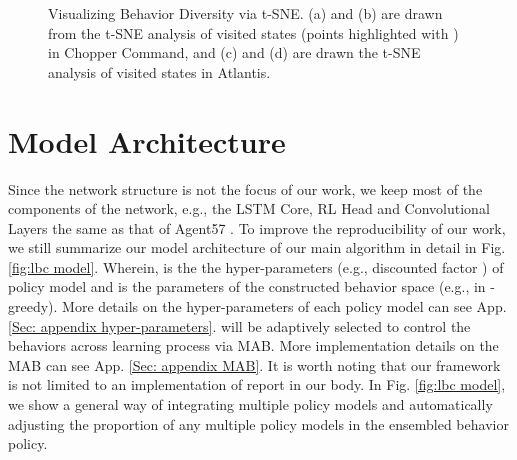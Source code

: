 \begin{figure*}[!t]
\vspace{-0.1in}
\caption{Visualizing Behavior Diversity via t-SNE. (a) and (b) are drawn from the t-SNE analysis of visited states (points highlighted  with ) in  Chopper Command, and (c) and (d) are drawn the t-SNE analysis of visited states in Atlantis.}
\label{fig:tsne study}
\end{figure*}






\clearpage





\section{Model Architecture}
\label{app: Model Architecture}



Since the network structure is not the focus of our work, we keep most of the components of the network, e.g., the LSTM Core, RL Head and Convolutional Layers the same as that of Agent57 \citep{agent57}. To improve the reproducibility of our work, we still summarize our  model architecture of our main algorithm in detail in Fig. \ref{fig:lbc model}.  Wherein,  is the the hyper-parameters (e.g., discounted factor  ) of policy model  and  is the parameters of the constructed behavior space (e.g.,  in -greedy). More details on the hyper-parameters of each policy model can see App. \ref{Sec: appendix hyper-parameters}.  will be adaptively selected to control the behaviors across learning process via MAB. More implementation details on the MAB can see App. \ref{Sec: appendix MAB}. It is worth noting that our framework is not limited to an implementation of report in our body. In Fig. \ref{fig:lbc model}, we show a general way of integrating multiple policy models and automatically adjusting the proportion of any multiple policy  models in the ensembled behavior policy.
 


